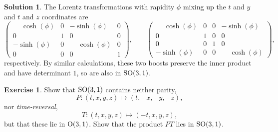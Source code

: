 \documentclass[11pt, a4paper]{report}
\theoremstyle{definition}
\newtheorem{ex}{Exercise}[part]
\newtheorem{sol}{Solution}[part]
\renewcommand*{\O}{\ensuremath\text{O}}
\newcommand*{\SO}{\ensuremath\text{SO}}
\begin{document}
\begin{sol}
The Lorentz transformations with rapidity $\phi$ mixing up the $t$ and $y$ and $t$ and $z$ coordinates are
\[
    \begin{pmatrix}
        \phantom{-}\cosh(\phi) & 0 & -\sinh(\phi)           & 0 \\
        0                      & 1 & 0                      & 0 \\
        -\sinh(\phi)           & 0 & \phantom{-}\cosh(\phi) & 0 \\
        0                      & 0 & 0                      & 1
    \end{pmatrix}, \qquad
    \begin{pmatrix}
        \phantom{-}\cosh(\phi) & 0 & 0 & -\sinh(\phi) \\
        0                      & 1 & 0 & 0 \\
        0                      & 0 & 1 & 0 \\
        -\sinh(\phi)           & 0 & 0 & \phantom{-}\cosh(\phi)
    \end{pmatrix},
\]
respectively.
By similar calculations, these two boosts preserve the inner product and have determinant $1$, so are also in $\SO(3, 1)$.

\end{sol}

\begin{ex}

Show that $\SO(3, 1)$ contains neither parity,
\[
    P: (t, x, y, z) \mapsto (t, -x, -y, -z),
\]
nor \emph{time-reversal},
\[
    T: (t, x, y, z) \mapsto (-t, x, y, z),
\]
but that these lie in $\O(3, 1)$. Show that the product $PT$ lies in $\SO(3, 1)$.

\end{ex}
\end{document}
